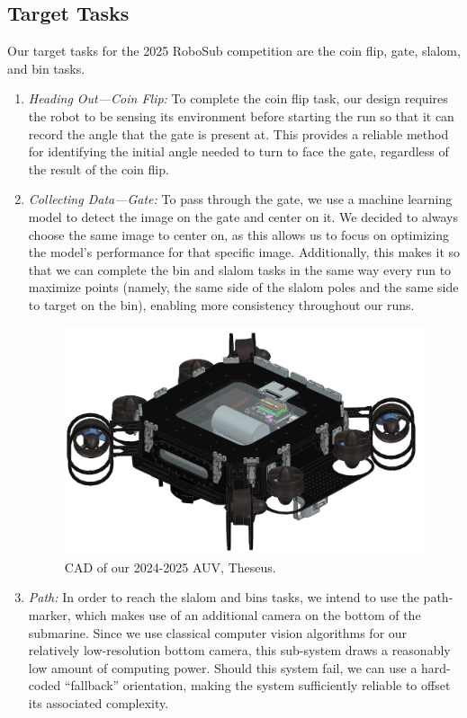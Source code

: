 \documentclass[conference]{IEEEtran}
\begin{document}
\subsection{Target Tasks} \label{ssec:target_goals}
Our target tasks for the 2025 RoboSub competition are the coin flip, gate, slalom, and bin tasks.
\begin{enumerate}
\item \textit{Heading Out---Coin Flip:}
To complete the coin flip task, our design requires the robot to be sensing its environment before starting the run so that it can record the angle that the gate is present at. This provides a reliable method for identifying the initial angle needed to turn to face the gate, regardless of the result of the coin flip. 
\item \textit{Collecting Data---Gate:}
To pass through the gate, we use a machine learning model to detect the image on the gate and center on it. We decided to always choose the same image to center on, as this allows us to focus on optimizing the model’s performance for that specific image. Additionally, this makes it so that we can complete the bin and slalom tasks in the same way every run to maximize points (namely, the same side of the slalom poles and the same side to target on the bin), enabling more consistency throughout our runs.

\begin{figure}
    \centerline{\includegraphics[scale=0.35]{images/FullSub2025-5.png}}
    \caption{CAD of our 2024-2025 AUV, Theseus.}
    \label{fig:sub4}
\end{figure}

\item \textit{Path:}
In order to reach the slalom and bins tasks, we intend to use the path-marker, which makes use of an additional camera on the bottom of the submarine.
Since we use classical computer vision algorithms for our relatively low-resolution bottom camera, this sub-system draws a reasonably low amount of computing power. Should this system fail, we can use a hard-coded “fallback” orientation, making the system sufficiently reliable to offset its associated complexity.


\end{enumerate}
\end{document}

